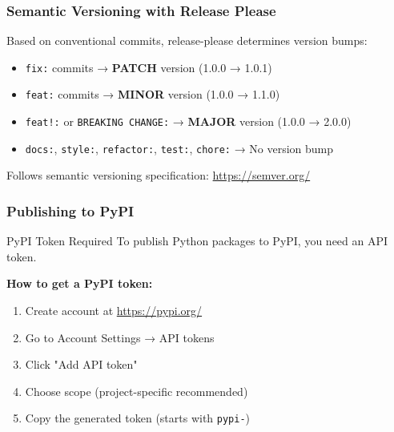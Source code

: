 \begin{frame}
	\frametitle{Semantic Versioning with Release Please}
	Based on conventional commits, release-please determines version bumps:
	\begin{itemize}[<+->]
		\item \texttt{fix:} commits → \textbf{PATCH} version (1.0.0 → 1.0.1)
		\item \texttt{feat:} commits → \textbf{MINOR} version (1.0.0 → 1.1.0)
		\item \texttt{feat!:} or \texttt{BREAKING CHANGE:} → \textbf{MAJOR} version (1.0.0 → 2.0.0)
		\item \texttt{docs:}, \texttt{style:}, \texttt{refactor:}, \texttt{test:}, \texttt{chore:} → No version bump
	\end{itemize}
	\begin{docs}
		{Follows semantic versioning specification: \url{https://semver.org/}}
	\end{docs}
\end{frame}

\begin{frame}
	\frametitle{Publishing to PyPI}
	\begin{block}{PyPI Token Required}
		{To publish Python packages to PyPI, you need an API token.}
	\end{block}
	\pause
	\textbf{How to get a PyPI token:}
	\begin{enumerate}
		\item Create account at \url{https://pypi.org/}
		\item Go to Account Settings → API tokens
		\item Click "Add API token"
		\item Choose scope (project-specific recommended)
		\item Copy the generated token (starts with \texttt{pypi-})
	\end{enumerate}
\end{frame}

